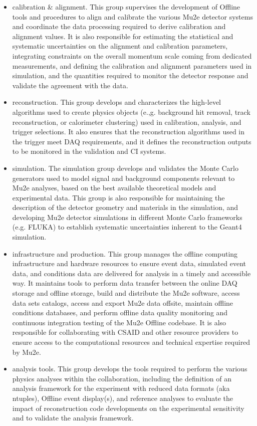 \begin{itemize}

\item calibration \& alignment. This group supervises the development of Offline tools and procedures to align and calibrate the various Mu2e detector systems and coordinate the data processing required to derive calibration and alignment values. It is also responsible for estimating the statistical and systematic uncertainties on the alignment and calibration parameters, integrating constraints on the overall momentum scale coming from dedicated measurements, and defining the calibration and alignment parameters used in simulation, and the quantities required to monitor the detector response and validate the agreement with the data.

\item reconstruction. This group develops and characterizes the high-level algorithms used to create physics objects (e.,g. background hit removal, track reconstruction, or calorimeter clustering) used in calibration, analysis, and trigger selections. It also ensures that the reconstruction algorithms used in the trigger meet DAQ requirements, and it defines the reconstruction outputs to be monitored in the validation and CI systems. 

\item simulation. The simulation group develops and validates the Monte Carlo generators used to model signal and background components relevant to Mu2e analyses, based on the best available theoretical models and experimental data. This group is also responsible for maintaining the description of the detector geometry and materials in the simulation, and developing Mu2e detector simulations in different Monte Carlo frameworks (e.g. FLUKA) to establish systematic uncertainties inherent to the Geant4 simulation.

\item infrastructure and production. This group manages the offline computing infrastructure and hardware resources to ensure event data, simulated event data, and conditions data are delivered for analysis in a timely and accessible way. It maintains tools to perform data transfer between the online DAQ storage and offline storage, build and distribute the Mu2e software, access data sets catalogs, access and export Mu2e data offsite, maintain offline conditions databases, and perform offline data quality monitoring and continuous integration testing of the Mu2e Offline codebase. It is also responsible for collaborating with CSAID and other resource providers to ensure access to the computational resources and technical expertise required by Mu2e.

\item analysis tools. This group develops the tools required to perform the various physics analyses within the collaboration, including the definition of an analysis framework for the experiment with reduced data formats (aka ntuples), Offline event display(s), and reference analyses to evaluate the impact of reconstruction code developments on the experimental sensitivity and to validate the analysis framework.

\end{itemize}

